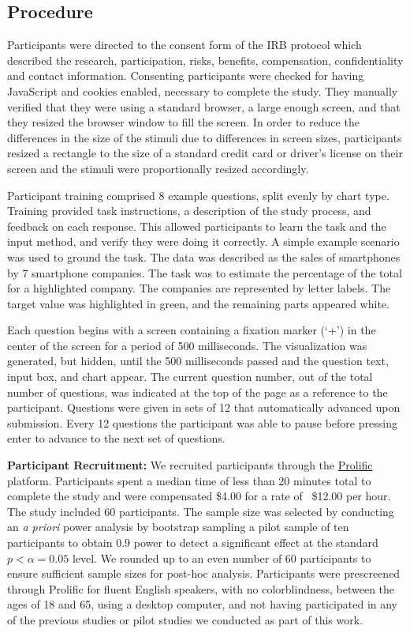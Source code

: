 \documentclass[preprint]{vgtc}               %
\begin{document}
\subsection{Procedure}
\label{sec:procedure}

Participants were directed to the consent form of the IRB protocol which described the research, participation, risks, benefits, compensation, confidentiality and contact information. 
Consenting participants were checked for having JavaScript and cookies enabled, necessary to complete the study. 
They manually verified that they were using a standard browser, a large enough screen, and that they resized the browser window to fill the screen.
In order to reduce the differences in the size of the stimuli due to differences in screen sizes, participants resized a rectangle to the size of a standard credit card or driver's license on their screen and the stimuli were proportionally resized accordingly.

Participant training comprised 8 example questions, split evenly by chart type. 
Training provided task instructions, a description of the study process, and feedback on each response. 
This allowed participants to learn the task and the input method, and verify they were doing it correctly.
A simple example scenario was used to ground the task.
The data was described as the sales of smartphones by 7 smartphone companies.
The task was to estimate the percentage of the total for a highlighted company.
The companies are represented by letter labels. 
The target value was highlighted in green, and the remaining parts appeared white.

Each question begins with a screen containing a fixation marker (`+') in the center of the screen for a period of 500 milliseconds. 
The visualization was generated, but hidden, until the 500 milliseconds passed and the question text, input box, and chart appear. 
The current question number, out of the total number of questions, was indicated at the top of the page as a reference to the participant.
Questions were given in sets of 12 that automatically advanced upon submission. 
Every 12 questions the participant was able to pause before pressing enter to advance to the next set of questions.

\textbf{Participant Recruitment:}
We recruited participants through the \href{https://www.prolific.com/}{Prolific} platform. 
Participants spent a median time of less than 20 minutes total to complete the study and were compensated \$4.00 for a rate of ~\$12.00 per hour. 
The study included 60 participants.
The sample size was selected by conducting an \textit{a priori} power analysis by bootstrap sampling a pilot sample of ten participants to obtain 0.9 power to detect a significant effect at the standard $p<\alpha= 0.05$ level. 
We rounded up to an even number of 60 participants to ensure sufficient sample sizes for post-hoc analysis. 
Participants were prescreened through Prolific for fluent English speakers, with no colorblindness, between the ages of 18 and 65, using a desktop computer, and not having participated in any of the previous studies or pilot studies we conducted as part of this work. 
\end{document}
